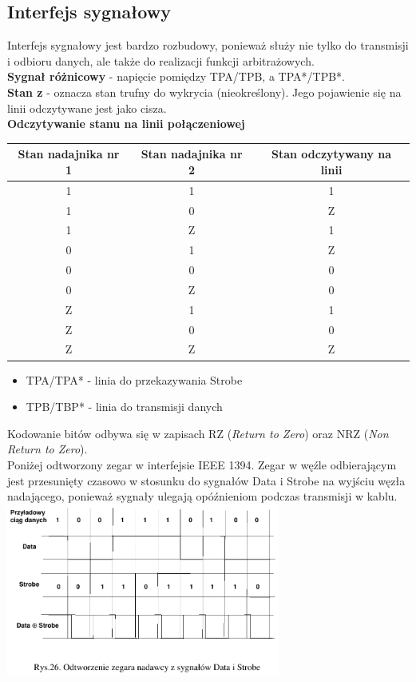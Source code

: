 \subsection{Interfejs sygnałowy}
Interfejs sygnałowy jest bardzo rozbudowy, ponieważ służy nie tylko do transmisji i odbioru danych, ale także do realizacji funkcji arbitrażowych.\\
\textbf{Sygnał różnicowy} - napięcie pomiędzy TPA/TPB, a TPA*/TPB*.\\
\textbf{Stan z} - oznacza stan trufny do wykrycia (nieokreślony). Jego pojawienie się na linii odczytywane jest jako cisza. \\

\textbf{Odczytywanie stanu na linii połączeniowej} \\
\begin{tabular}{|c|c|c|}
	\hline Stan nadajnika nr 1 & Stan nadajnika nr 2 & Stan odczytywany na linii \\ 
	\hline 1 & 1 & 1 \\ 
	\hline 1 & 0 & Z \\ 
	\hline 1 & Z & 1 \\ 
	\hline 0 & 1 & Z \\ 
	\hline 0 & 0 & 0 \\ 
	\hline 0 & Z & 0 \\ 
	\hline Z & 1 & 1 \\ 
	\hline Z & 0 & 0 \\ 
	\hline Z & Z & Z \\ 
	\hline 
\end{tabular} 
\begin{itemize}
	\item TPA/TPA* - linia do przekazywania Strobe
	\item TPB/TBP* - linia do transmisji danych
\end{itemize}
Kodowanie bitów odbywa się w zapisach RZ (\emph{Return to Zero}) oraz NRZ (\emph{Non Return to Zero}).\\
Poniżej odtworzony zegar w interfejsie IEEE 1394. Zegar w węźle odbierającym jest przesunięty czasowo w stosunku do sygnałów Data i Strobe na wyjściu węzła nadającego, ponieważ sygnały ulegają opóźnieniom podczas transmisji w kablu.\\
\includegraphics[width=9cm]{./wyklady/FIREWIRE_28_1.pdf}\\\\
